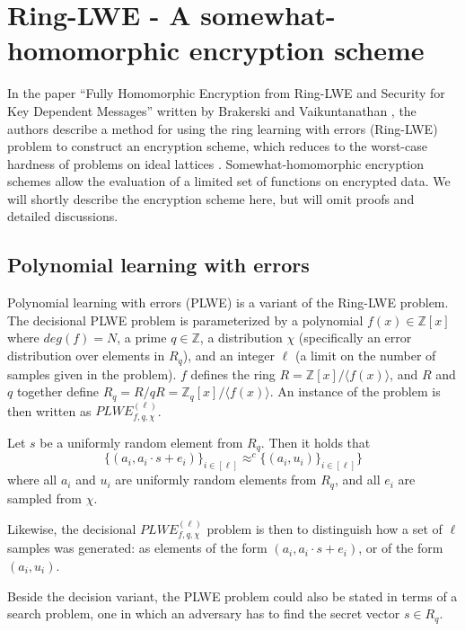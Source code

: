 \documentclass[../main.tex]{subfiles}
\begin{document}
\section{Ring-LWE - A somewhat-homomorphic encryption scheme} \label{sec:RLWE-theory}

In the paper ``Fully Homomorphic Encryption from Ring-LWE and Security for Key Dependent Messages'' written by
Brakerski and Vaikuntanathan \cite{brakerski2011fully},
the authors describe a method for using the ring learning with errors (Ring-LWE) problem to construct an encryption scheme,
which reduces to the worst-case hardness of problems on ideal lattices \cite{brakerski2011fully}.
Somewhat-homomorphic encryption schemes allow the evaluation of a limited set of functions on encrypted data.
We will shortly describe the encryption scheme here, but will omit proofs and detailed discussions.

\subsection{Polynomial learning with errors}

Polynomial learning with errors (PLWE) is a variant of the Ring-LWE problem.
The decisional PLWE problem is parameterized by a polynomial $f(x) \in \mathbb{Z}[x]$ where $deg(f) = N$, a prime $q \in \mathbb{Z}$, a distribution $\chi$ (specifically an error distribution over elements in $R_q$), and an integer $\ell$ (a limit on the number of samples given in the problem).
$f$ defines the ring $R = \mathbb{Z}[x] / \langle f(x) \rangle$, and $R$ and $q$ together define $R_q = R / q R = \mathbb{Z}_q[x] / \langle f(x) \rangle$.
An instance of the problem is then written as $PLWE_{f, q, \chi}^{(\ell)}$.

\begin{definition}
    Let $s$ be a uniformly random element from $R_q$.
    Then it holds that 
    \[
        \{ (a_i, a_i \cdot s + e_i) \}_{i \in [\ell]} \approx^{c} \{(a_i, u_i) \}_{i \in [\ell]}\}
    \]
    where all $a_i$ and $u_i$ are uniformly random elements from $R_q$, and all $e_i$ are sampled from $\chi$.
\end{definition}

Likewise, the decisional $PLWE_{f, q, \chi}^{(\ell)}$ problem is then to distinguish how a set of $\ell$ samples was generated: as elements of the form $(a_i, a_i \cdot s + e_i)$, or of the form $(a_i, u_i)$.

Beside the decision variant, the PLWE problem could also be stated in terms of a search problem, one in which
an adversary has to find the secret vector $s \in R_q$.
\end{document}
